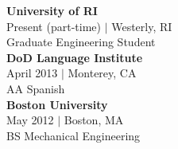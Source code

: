 {\sc \textbf{University of RI}} \\
{\color{gray} Present (part-time) $\vert$ Westerly, RI}\\
Graduate Engineering Student \\

{\sc \textbf{DoD Language Institute}}\\ 
{\color{gray} April 2013 $\vert$ Monterey, CA } \\
AA Spanish \\

{\sc \textbf{Boston University}}\\ 
{\color{gray} May 2012 $\vert$ Boston, MA } \\
BS Mechanical Engineering \\
